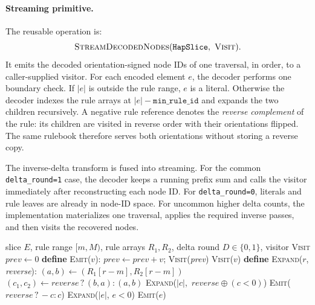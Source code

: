 \paragraph{Streaming primitive.}
The reusable operation is:
\[
  \textsc{StreamDecodedNodes}(\texttt{HapSlice},\ \textsc{Visit}).
\]
It emits the decoded orientation-signed node IDs of one traversal, in order, to a
caller-supplied visitor. For each encoded element $e$, the decoder performs one
boundary check. If $|e|$ is outside the rule range, $e$ is a literal. Otherwise
the decoder indexes the rule arrays at $|e|-\texttt{min\_rule\_id}$ and expands
the two children recursively. A negative rule reference denotes the \emph{reverse
complement} of the rule: its children are visited in reverse order with their
orientations flipped. The same rulebook therefore serves both orientations without
storing a reverse copy.

The inverse-delta transform is fused into streaming. For the common
\texttt{delta\_round=1} case, the decoder keeps a running prefix sum and calls
the visitor immediately after reconstructing each node ID. For
\texttt{delta\_round=0}, literals and rule leaves are already in node-ID space.
For uncommon higher delta counts, the implementation materializes one traversal,
applies the required inverse passes, and then visits the recovered nodes.

\begin{algorithm}[t]
  \caption{Streaming traversal expansion for \texttt{delta\_round} 0 or 1}
  \label{alg:ce-stream}
  \begin{algorithmic}[1]
    \REQUIRE slice $E$, rule range $[m,M)$, rule arrays $R_1,R_2$,
             delta round $D \in \{0,1\}$, visitor \textsc{Visit}
    \STATE $\textit{prev} \gets 0$
    \STATE \textbf{define} \textsc{Emit}($v$):
      \STATE $\textit{prev} \gets \textit{prev} + v$; \textsc{Visit}(\textit{prev})
    \ELSE
      \STATE \textsc{Visit}($v$)
    \ENDIF
    \STATE \textbf{define} \textsc{Expand}($r$, \textit{reverse}):
    \STATE \quad $(a,b) \gets (R_1[r-m], R_2[r-m])$
    \STATE \quad $(c_1,c_2) \gets \textit{reverse}\,?\,(b,a):(a,b)$
      \IF{$|c| \in [m,M)$}
        \STATE \textsc{Expand}($|c|$, $\,\textit{reverse}\oplus(c<0)$)
      \ELSE
        \STATE \textsc{Emit}($\textit{reverse}\,?\,{-}c:c$)
      \ENDIF
    \ENDFOR
      \IF{$|e| \in [m,M)$}
        \STATE \textsc{Expand}($|e|$, $e < 0$)
      \ELSE
        \STATE \textsc{Emit}($e$)
      \ENDIF
    \ENDFOR
  \end{algorithmic}
\end{algorithm}

